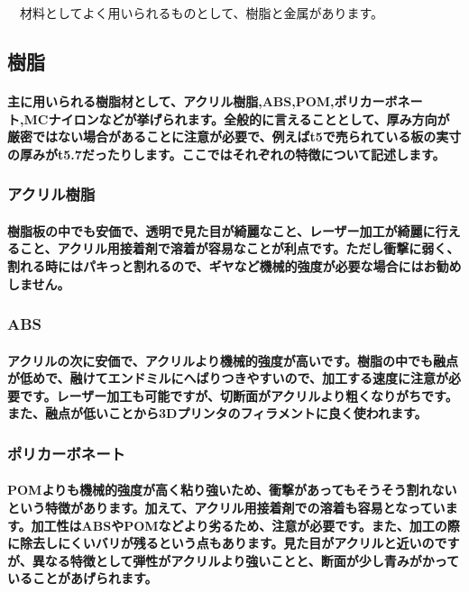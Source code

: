 \documentclass[b5paper, 9pt, twocolumn, titlepage,openany]{jsbook}%
\begin{document}
　材料としてよく用いられるものとして、樹脂と金属があります。

\subsection{樹脂}

\paragraph{主に用いられる樹脂材として、アクリル樹脂,ABS,POM,ポリカーボネート,MCナイロンなどが挙げられます。全般的に言えることとして、厚み方向が厳密ではない場合があることに注意が必要で、例えばt5で売られている板の実寸の厚みがt5.7だったりします。ここではそれぞれの特徴について記述します。}

\subsubsection{アクリル樹脂}

\paragraph{樹脂板の中でも安価で、透明で見た目が綺麗なこと、レーザー加工が綺麗に行えること、アクリル用接着剤で溶着が容易なことが利点です。ただし衝撃に弱く、割れる時にはパキっと割れるので、ギヤなど機械的強度が必要な場合にはお勧めしません。}

\subsubsection{ABS}

\paragraph{アクリルの次に安価で、アクリルより機械的強度が高いです。樹脂の中でも融点が低めで、融けてエンドミルにへばりつきやすいので、加工する速度に注意が必要です。レーザー加工も可能ですが、切断面がアクリルより粗くなりがちです。また、融点が低いことから3Dプリンタのフィラメントに良く使われます。}

\subsubsection{ポリカーボネート}

\paragraph{POMよりも機械的強度が高く粘り強いため、衝撃があってもそうそう割れないという特徴があります。加えて、アクリル用接着剤での溶着も容易となっています。加工性はABSやPOMなどより劣るため、注意が必要です。また、加工の際に除去しにくいバリが残るという点もあります。見た目がアクリルと近いのですが、異なる特徴として弾性がアクリルより強いことと、断面が少し青みがかっていることがあげられます。}
\end{document}
